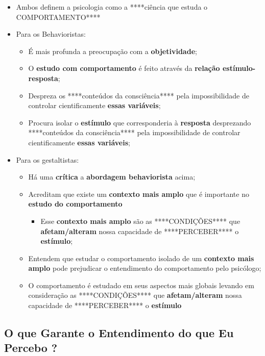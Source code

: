 \documentclass[
]{book}
\providecommand{\tightlist}{%
  \setlength{\itemsep}{0pt}\setlength{\parskip}{0pt}}
\begin{document}
\begin{itemize}
\tightlist
\item
  Ambos definem a psicologia como a ****ciência que estuda o COMPORTAMENTO****
\item
  Para os Behavioristas:

  \begin{itemize}
  \tightlist
  \item
    É mais profunda a preocupação com a \textbf{objetividade};
  \item
    O \textbf{estudo com comportamento} é feito através da \textbf{relação estímulo-resposta};
  \item
    Despreza os ****conteúdos da consciência**** pela impossibilidade de controlar cientificamente \textbf{essas variáveis};
  \item
    Procura isolar o \textbf{estímulo} que corresponderia à \textbf{resposta} desprezando ****conteúdos da consciência**** pela impossibilidade de controlar cientificamente \textbf{essas variáveis};
  \end{itemize}
\item
  Para os gestaltistas:

  \begin{itemize}
  \tightlist
  \item
    Há uma \textbf{crítica} a \textbf{abordagem behaviorista} acima;
  \item
    Acreditam que existe um \textbf{contexto mais amplo} que é importante no \textbf{estudo do comportamento}

    \begin{itemize}
    \tightlist
    \item
      Esse \textbf{contexto mais amplo} são as ****CONDIÇÕES**** que \textbf{afetam/alteram} nossa capacidade de ****PERCEBER**** o \textbf{estímulo};
    \end{itemize}
  \item
    Entendem que estudar o comportamento isolado de um \textbf{contexto mais amplo} pode prejudicar o entendimento do comportamento pelo psicólogo;
  \item
    O comportamento é estudado em seus aspectos mais globais levando em consideração as ****CONDIÇÕES**** que \textbf{afetam/alteram} nossa capacidade de ****PERCEBER**** o \textbf{estímulo}
  \end{itemize}
\end{itemize}

\hypertarget{o-que-garante-o-entendimento-do-que-eu-percebo}{%
\subsection{O que Garante o Entendimento do que Eu Percebo ?}\label{o-que-garante-o-entendimento-do-que-eu-percebo}}
\end{document}
